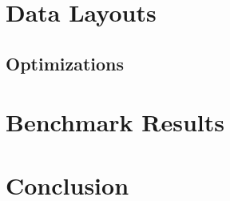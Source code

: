 \documentclass[10pt]{sig-alternate}
\begin{document}
\section{Data Layouts}
\label{sec:data_layouts}

\subsection{Optimizations}

\section{Benchmark Results}

\section{Conclusion}

\end{document}
